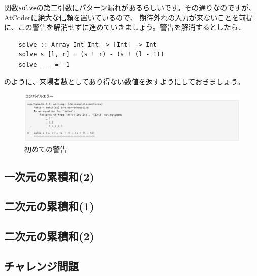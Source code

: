 \documentclass[12pt,a4paper,dvipdfmx,fleqn]{article}%
\theoremstyle{definition}
\newtheorem*{toi*}{問題}
\theoremstyle{definition}
\newtheorem*{ans*}{解説}
\theoremstyle{definition}
\begin{document}
関数\texttt{solve}の第二引数にパターン漏れがあるらしいです。その通りなのですが、AtCoderに絶大な信頼を置いているので、
期待外れの入力が来ないことを前提に、この警告を解消せずに進めていきましょう。警告を解消するとしたら、
\begin{verbatim}
    solve :: Array Int Int -> [Int] -> Int
    solve s [l, r] = (s ! r) - (s ! (l - 1))
    solve _ _ = -1
\end{verbatim}
のように、来場者数としてあり得ない数値を返すようにしておきましょう。
\begin{figure}[htbp]
    \centering
    \includegraphics[width=\textwidth]{img/first-warning.png}
    \caption{初めての警告}
    \label{初めての警告}
\end{figure}

\subsection{一次元の累積和(2)}\label{一次元の累積和(2)}
\subsection{二次元の累積和(1)}\label{二次元の累積和(1)}
\subsection{二次元の累積和(2)}\label{二次元の累積和(2)}
\subsection{チャレンジ問題}\label{チャレンジ問題2}
\end{document}

